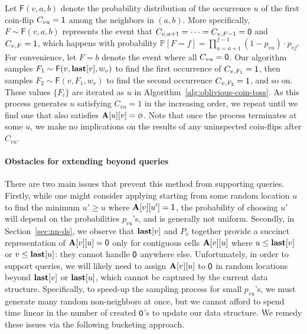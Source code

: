 Let $\mathsf{F}(v,a,b)$ denote the probability distribution of the occurrence $u$ of the first coin-flip $C_{vu} = \mathsf{1}$ among the neighbors in $(a, b)$.
More specifically, $F\sim\mathsf{F}(v,a,b)$ represents the event that $C_{v,a+1}=\cdots=C_{v,F-1}=\mathsf{0}$ and $C_{v,F}=\mathsf{1}$,
which happens with probability $\mathbb P[F=f]=\prod_{u=a+1}^{f-1} (1-p_{vu}) \cdot p_{vf}$.
For convenience, let $F = b$ denote the event where all $C_{vu}=\mathsf{0}$. Our algorithm samples $F_1\sim\mathsf{F}(v,\mathbf{last}[v],w_v)$ to find the first occurrence of $C_{v,F_1} = \mathsf{1}$, then samples $F_2\sim\mathsf{F}(v,F_1,w_v)$ to find the second occurrence $C_{v,F_2} = \mathsf{1}$, and so on.
These values $\{F_i\}$ are iterated as $u$ in Algorithm~\ref{alg:oblivious-coin-toss}.
As this process generates $u$ satisfying $C_{vu}=1$ in the increasing order, we repeat until we find one that also satisfies $\mathbf{A}[u][v]=\phi$.
Note that once the process terminates at some $u$, we make no implications on the results of any uninspected coin-flips after $C_{vu}$.

\paragraph*{Obstacles for extending beyond  queries}
There are two main issues that prevent this method from supporting  queries.
Firstly, while one might consider applying  starting from some random location $u$ to find the minimum $u' \geq u$
where $\mathbf{A}[v][u']=\mathsf{1}$, the probability of choosing $u'$ will depend on the probabilities $p_{vu}$'s, and is generally not uniform.
Secondly, in Section~\ref{sec:nn-ds}, we observe that $\mathbf{last}[v]$ and $P_v$ together provide a succinct representation of $\mathbf{A}[v][u] = \mathsf{0}$
only for contiguous cells $\mathbf{A}[v][u]$ where $u \leq \mathbf{last}[v]$ or $v \leq \mathbf{last}[u]$: they cannot handle $\mathsf{0}$ anywhere else.
Unfortunately, in order to support  queries, we will likely need to assign $\mathbf{A}[v][u]$ to $\mathsf{0}$ in random locations
beyond $\mathbf{last}[v]$ or $\mathbf{last}[u]$, which cannot be captured by the current data structure.
Specifically, to speed-up the sampling process for small $p_{vu}$'s, we must generate many random non-neighbors at once,
but we cannot afford to spend time linear in the number of created $\mathsf{0}$'s to update our data structure.
We remedy these issues via the following bucketing approach.
